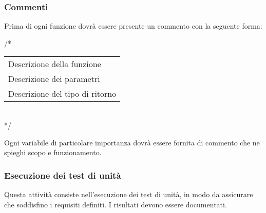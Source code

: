 \subsubsection{Commenti}

Prima di ogni funzione dovrà essere presente un commento con la seguente forma:

\begin{flushleft}
/*\\
\vspace{3mm}
\begin{tabular}{l}
	Descrizione della funzione\\
	Descrizione dei parametri\\		
	Descrizione del tipo di ritorno\\
\end{tabular}\\
\vspace{3mm}
*/

\end{flushleft}

Ogni variabile di particolare importanza dovrà essere fornita di commento che ne spieghi scopo e funzionamento.

\subsubsection{Esecuzione dei test di unità}
Questa attività consiste nell'esecuzione dei test di unità, in modo da assicurare che soddisfino i requisiti definiti. I risultati devono essere documentati.


